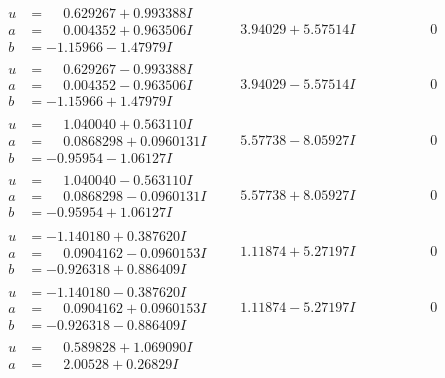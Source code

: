\documentclass[1p]{elsarticle_modified}
\theoremstyle{definition}
\begin{document}
$$\begin{array}{c|c|c}
 \hline 
\begin{aligned}
u &= \phantom{-}0.629267 + 0.993388 I \\
a &= \phantom{-}0.004352 + 0.963506 I \\
b &= -1.15966 - 1.47979 I\end{aligned}
 & \phantom{-}3.94029 + 5.57514 I & \phantom{-0.000000 } 0 \\ \hline\begin{aligned}
u &= \phantom{-}0.629267 - 0.993388 I \\
a &= \phantom{-}0.004352 - 0.963506 I \\
b &= -1.15966 + 1.47979 I\end{aligned}
 & \phantom{-}3.94029 - 5.57514 I & \phantom{-0.000000 } 0 \\ \hline\begin{aligned}
u &= \phantom{-}1.040040 + 0.563110 I \\
a &= \phantom{-}0.0868298 + 0.0960131 I \\
b &= -0.95954 - 1.06127 I\end{aligned}
 & \phantom{-}5.57738 - 8.05927 I & \phantom{-0.000000 } 0 \\ \hline\begin{aligned}
u &= \phantom{-}1.040040 - 0.563110 I \\
a &= \phantom{-}0.0868298 - 0.0960131 I \\
b &= -0.95954 + 1.06127 I\end{aligned}
 & \phantom{-}5.57738 + 8.05927 I & \phantom{-0.000000 } 0 \\ \hline\begin{aligned}
u &= -1.140180 + 0.387620 I \\
a &= \phantom{-}0.0904162 - 0.0960153 I \\
b &= -0.926318 + 0.886409 I\end{aligned}
 & \phantom{-}1.11874 + 5.27197 I & \phantom{-0.000000 } 0 \\ \hline\begin{aligned}
u &= -1.140180 - 0.387620 I \\
a &= \phantom{-}0.0904162 + 0.0960153 I \\
b &= -0.926318 - 0.886409 I\end{aligned}
 & \phantom{-}1.11874 - 5.27197 I & \phantom{-0.000000 } 0 \\ \hline\begin{aligned}
u &= \phantom{-}0.589828 + 1.069090 I \\
a &= \phantom{-}2.00528 + 0.26829 I \\

\end{aligned}
\end{array}$$
\end{document}
